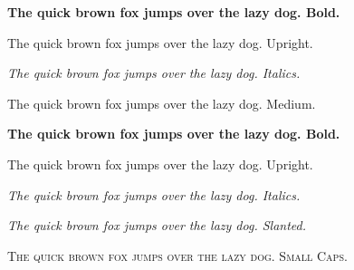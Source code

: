 \textbf{The quick brown fox jumps over the lazy dog. Bold.}

\textup{The quick brown fox jumps over the lazy dog. Upright.}

\textit{The quick brown fox jumps over the lazy dog. Italics.}



\rmfamily\blindtext

\textmd{The quick brown fox jumps over the lazy dog. Medium.}

\textbf{The quick brown fox jumps over the lazy dog. Bold.}

\textup{The quick brown fox jumps over the lazy dog. Upright.}

\textit{The quick brown fox jumps over the lazy dog. Italics.}

\textsl{The quick brown fox jumps over the lazy dog. Slanted.}

\textsc{The quick brown fox jumps over the lazy dog. Small Caps.}

